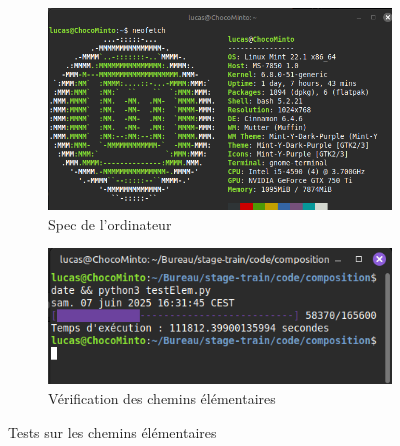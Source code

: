 \documentclass[runningheads]{llncs}
\begin{document}

\begin{figure}
	\begin{subfigure}{0.5\textwidth}
		\centering
		\includegraphics[width=\textwidth]{img/spec_pc.png}
		\caption{Spec de l'ordinateur}
	\end{subfigure}
	\begin{subfigure}{0.5\textwidth}
		\centering
		\includegraphics[width=\textwidth+0.5cm]{img/testElem.png}
		\caption{Vérification des chemins élémentaires}
	\end{subfigure}
	\caption{Tests sur les chemins élémentaires}
\end{figure}
\label{fig:elem-tests}
\end{document}
